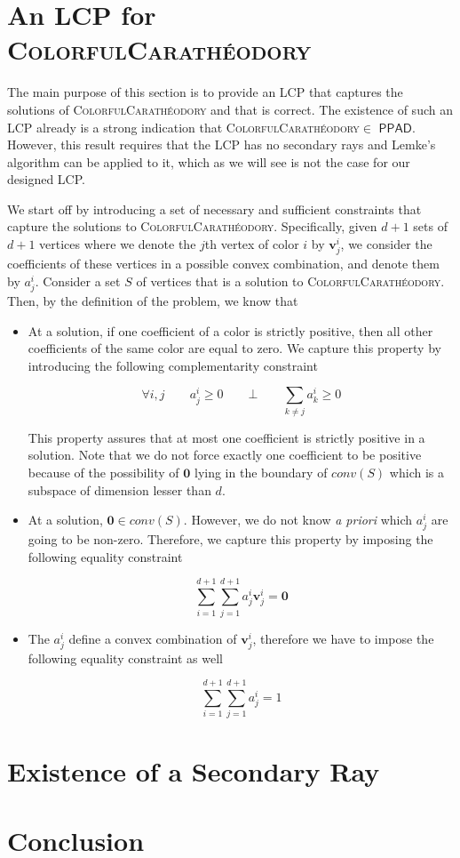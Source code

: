\documentclass[a4paper,11pt]{article}
\def\cc#1{\mathsf{#1}}
\def\PPAD{\ensuremath{\cc{PPAD}}\xspace}
\def\problem#1{\textsc{#1}}
\def\org{\bm{0}}
\def\v{\textbf{v}}
\def\CCP{\problem{ColorfulCarath\'eodory}\xspace}
\begin{document}
\section{An LCP for \CCP}

\par The main purpose of this section is to provide an LCP that captures the solutions of \CCP and that is
correct. The existence of such an LCP already is a strong indication that \CCP $\in$ \PPAD. However, this
result requires that the LCP has no secondary rays and Lemke's algorithm can be applied to it, which as we
will see is not the case for our designed LCP.

\par We start off by introducing a set of necessary and sufficient constraints that capture the solutions to
\CCP. Specifically, given $d+1$ sets of $d+1$ vertices where we denote the $j$th vertex of color $i$ by
$\v^i_j$, we consider the coefficients of these vertices in a possible convex combination, and denote them
by $a^i_j$. Consider a set $S$ of vertices that is a solution to \CCP. Then, by the definition of the problem,
we know that

\begin{itemize}
\item At a solution, if one coefficient of a color is strictly positive, then all other coefficients of the same
color are equal to zero. We capture this property by introducing the following complementarity constraint

\[
\forall i, j \qquad a^i_j \geq 0 \qquad \bot \qquad \sum_{k \neq j} {a^i_k} \geq 0
\]

This property assures that at most one coefficient is strictly positive in a solution. Note that we do not force
exactly one coefficient to be positive because of the possibility of $\org$ lying in the boundary of $conv(S)$
which is a subspace of dimension lesser than $d$.

\item At a solution, $\org \in conv(S)$. However, we do not know \textit{a priori} which $a^i_j$ are going to be
non-zero. Therefore, we capture this property by imposing the following equality constraint

\[
\sum_{i = 1}^{d+1} { \sum_{j = 1}^{d+1} {a^i_j \v^i_j } } = \org
\]

\item The $a^i_j$ define a convex combination of $\v^i_j$, therefore we have to impose the following equality
constraint as well

\[
\sum_{i = 1}^{d+1} { \sum_{j = 1}^{d+1} {a^i_j} } = 1
\]


\end{itemize}

\section{Existence of a Secondary Ray}


\section{Conclusion}




\end{document}
